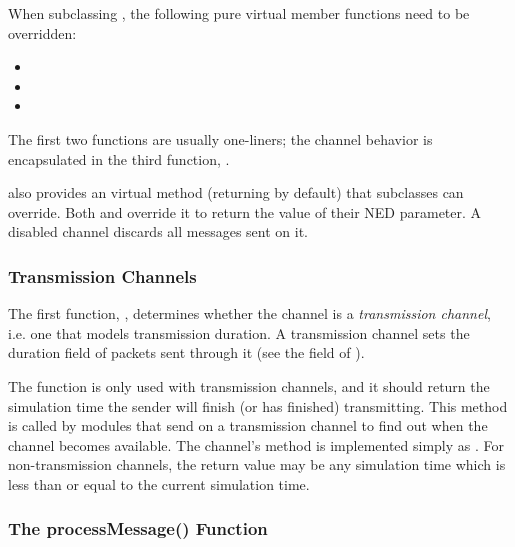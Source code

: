 When subclassing , the following pure virtual member functions
need to be overridden:

\begin{itemize}
  \item {}
  \item {}
  \item {}
\end{itemize}

The first two functions are usually one-liners; the channel behavior is
encapsulated in the third function, .

 also provides an  virtual method
(returning  by default) that subclasses can override.
Both  and  override it
to return the value of their  NED parameter. A disabled
channel discards all messages sent on it.

\subsubsection{Transmission Channels}
\label{sec:simple-modules:transmission-channels}

The first function, , determines whether
the channel is a \textit{transmission channel}, i.e. one that models
transmission duration. A transmission channel sets the duration field of
packets sent through it (see the  field of
).

The  function is only used with
transmission channels, and it should return the simulation time the sender
will finish (or has finished) transmitting. This method is called by
modules that send on a transmission channel to find out when the channel
becomes available. The channel's  method is implemented
simply as . For
non-transmission channels, the  return
value may be any simulation time which is less than or equal to the current
simulation time.

\subsubsection{The processMessage() Function}
\label{sec:simple-modules:channel-processmessage}

